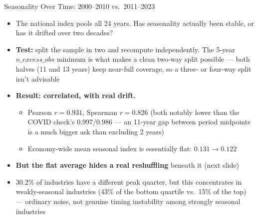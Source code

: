 \documentclass[aspectratio=169]{beamer}
\begin{document}
\begin{frame}{Seasonality Over Time: 2000--2010 vs.\ 2011--2023}
  \begin{itemize}
    \item The national index pools all 24 years. Has seasonality actually been
          stable, or has it drifted over two decades?
    \item \textbf{Test:} split the sample in two and recompute independently.
          The 5-year $n\_excess\_obs$ minimum is what makes a clean two-way
          split possible --- both halves (11 and 13 years) keep near-full
          coverage, so a three- or four-way split isn't advisable
    \bigskip
    \item \textbf{Result: correlated, with real drift.}
    \begin{itemize}
      \item Pearson $r = 0.931$, Spearman $r = 0.826$ (both notably lower
            than the COVID check's 0.997/0.986 --- an 11-year gap between
            period midpoints is a much bigger ask than excluding 2 years)
      \item Economy-wide mean seasonal index is essentially flat:
            $0.131 \to 0.122$
    \end{itemize}
    \bigskip
    \item \textbf{But the flat average hides a real reshuffling} beneath it
          (next slide)
    \item[$\to$] 30.2\% of industries have a different peak quarter, but this
          concentrates in weakly-seasonal industries (43\% of the bottom
          quartile vs.\ 15\% of the top) --- ordinary noise, not genuine
          timing instability among strongly seasonal industries
  \end{itemize}
\end{frame}
\end{document}
